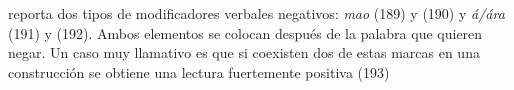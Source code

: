 \textcolor{MidnightBlue}{\citet{wari}} reporta dos tipos de modificadores verbales negativos: {\setmainfont{Charis SIL} \textit{mao}} (189) y (190) y {\setmainfont{Charis SIL} \textit{á/ára}} (191) y (192). Ambos elementos se colocan después de la palabra que quieren negar. Un caso muy llamativo es que si coexisten dos de estas marcas en una construcción se obtiene una lectura fuertemente positiva (193)